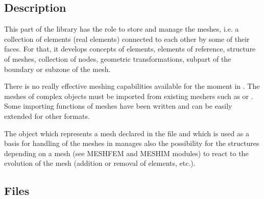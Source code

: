 \documentclass[a4paper,11pt,english]{sphinxmanual}
\begin{document}
\subsection{Description}
\label{\detokenize{project/libdesc_mesh:description}}
This part of the library has the role to store and manage the meshes, i.e. a
collection of elements (real elements) connected to each other by some of their
faces. For that, it develops concepts of elements, elements of reference,
structure of meshes, collection of nodes, geometric transformations, subpart of
the boundary or subzone of the mesh.

There is no really effective meshing capabilities available for the moment in
. The meshes of complex objects must be imported from existing meshers such
as  or . Some importing functions of meshes have been written and
can be easily extended for other formats.

The object which represents a mesh declared in the file  and
which is used as a basis for handling of the meshes in  manages also the
possibility for the structures depending on a mesh (see MESHFEM and MESHIM
modules) to react to the evolution of the mesh (addition or removal of elements,
etc.).


\subsection{Files}
\label{\detokenize{project/libdesc_mesh:files}}
\end{document}
